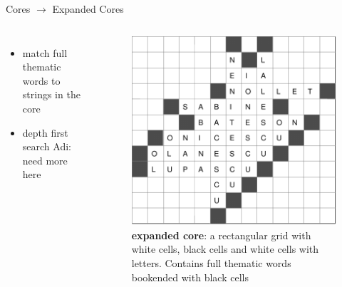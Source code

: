\documentclass[aspectratio=169,usenames,dvipsnames]{beamer}
\newcommand{\tcm}[1]{\textcolor{m7}{#1}}
\newcommand{\bei}{\begin{itemize}}
\newcommand{\eei}{\end{itemize}}
\newcommand{\ie}{\item}
\numberwithin{equation}{section}
\numberwithin{theorem}{section}
\numberwithin{lem}{section}
\numberwithin{df}{section}
\begin{document}


\begin{frame}{Cores $\to$ Expanded Cores}

\begin{columns}

\bei
\ie match full thematic words to strings in the core

\medskip

\ie depth first search \tcm{Adi: need more here}
\eei


\begin{figure}
\includegraphics[width=0.9\columnwidth]{_plots/extcore-alive-0-puzzle-72-2975-1488--1--1.pdf}
\caption{{\bf expanded core}: a rectangular grid with white cells, black cells and white cells with letters. Contains full thematic words bookended with black cells}
\end{figure}

\end{columns}

\end{frame}

\end{document}
